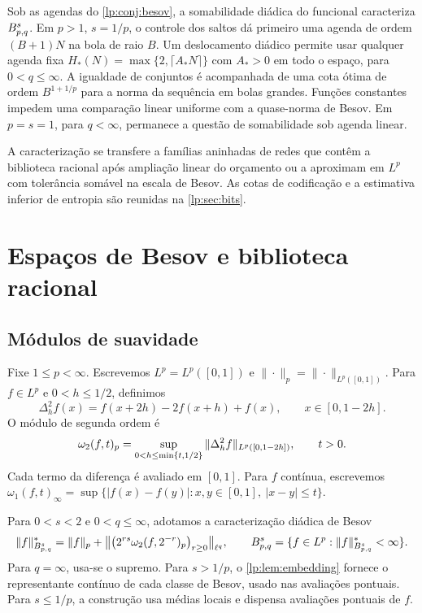 \documentclass[12pt,a4paper]{article}
\begin{document}
Sob as agendas do \cref{lp:conj:besov}, a somabilidade diádica do funcional caracteriza $B^{s}_{p,q}$. Em $p>1$, $s=1/p$, o controle dos saltos dá primeiro uma agenda de ordem $(B+1)N$ na bola de raio $B$. Um deslocamento diádico permite usar qualquer agenda fixa $H_*(N)=\max\{2,\lceil A_*N\rceil\}$ com $A_*>0$ em todo o espaço, para $0<q\le\infty$. A igualdade de conjuntos é acompanhada de uma cota ótima de ordem $B^{1+1/p}$ para a norma da sequência em bolas grandes. Funções constantes impedem uma comparação linear uniforme com a quase-norma de Besov. Em $p=s=1$, para $q<\infty$, permanece a questão de somabilidade sob agenda linear.

A caracterização se transfere a famílias aninhadas de redes que contêm a biblioteca racional após ampliação linear do orçamento ou a aproximam em $L^p$ com tolerância somável na escala de Besov. As cotas de codificação e a estimativa inferior de entropia são reunidas na \cref{lp:sec:bits}.

\section{Espaços de Besov e biblioteca racional}
\label{lp:sec:defs}

\subsection{Módulos de suavidade}

Fixe $1\le p<\infty$. Escrevemos $L^p=L^p([0,1])$ e $\|\cdot\|_p=\|\cdot\|_{L^p([0,1])}$. Para $f\in L^p$ e $0<h\le1/2$, definimos
\begin{equation}
 \Delta_h^2f(x)=f(x+2h)-2f(x+h)+f(x),\qquad x\in[0,1-2h].
 \label{lp:eq:second-difference}
\end{equation}
O módulo de segunda ordem é
\begin{equation}
 \omega_2(f,t)_{p}
 =\sup_{0<h\le\min\{t,1/2\}}\|\Delta_h^2f\|_{L^p([0,1-2h])},
 \qquad t>0.
 \label{lp:eq:modulus-p}
\end{equation}
Cada termo da diferença é avaliado em $[0,1]$. Para $f$ contínua, escrevemos
$\omega_1(f,t)_\infty=\sup\{|f(x)-f(y)|:x,y\in[0,1],\ |x-y|\le t\}$.

Para $0<s<2$ e $0<q\le\infty$, adotamos a caracterização diádica de Besov
\citep{artigo_2-devorelorentz1993,lp-ditzian1987}
\begin{equation}
 \|f\|^*_{B^{s}_{p,q}}
 =\|f\|_p+\big\|\big(2^{rs}\omega_2(f,2^{-r})_{p}\big)_{r\ge0}\big\|_{\ell^q},
 \qquad
 B^{s}_{p,q}=\{f\in L^p:\|f\|^*_{B^{s}_{p,q}}<\infty\}.
 \label{lp:eq:besov-p}
\end{equation}
Para $q=\infty$, usa-se o supremo. Para $s>1/p$, o \cref{lp:lem:embedding} fornece o representante contínuo de cada classe de Besov, usado nas avaliações pontuais. Para $s\le1/p$, a construção usa médias locais e dispensa avaliações pontuais de $f$.
\end{document}
